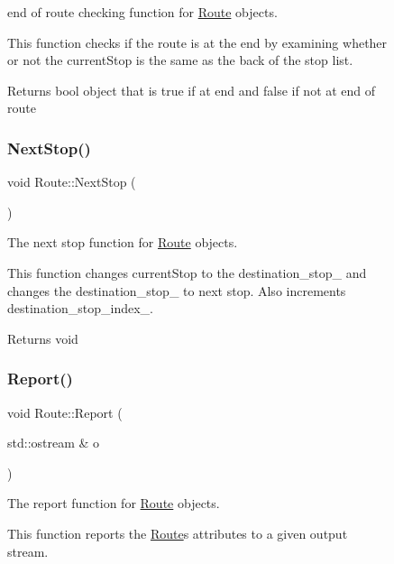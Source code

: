 \begin{figure}[H]
\begin{center}
end of route checking function for \hyperlink{classRoute}{Route} objects. 

This function checks if the route is at the end by examining whether or not the current\+Stop is the same as the back of the stop list.

\begin{DoxyReturn}{Returns}
bool object that is true if at end and false if not at end of route 
\end{DoxyReturn}
\mbox{\label{classRoute_aefdcf5a8db15f50d840585914744af6f}} 
\subsubsection{\texorpdfstring{Next\+Stop()}{NextStop()}}
{\footnotesize\ttfamily void Route\+::\+Next\+Stop (\begin{DoxyParamCaption}{ }\end{DoxyParamCaption})}



The next stop function for \hyperlink{classRoute}{Route} objects. 

This function changes current\+Stop to the destination\+\_\+stop\+\_\+ and changes the destination\+\_\+stop\+\_\+ to next stop. Also increments destination\+\_\+stop\+\_\+index\+\_\+.

\begin{DoxyReturn}{Returns}
void 
\end{DoxyReturn}
\mbox{\label{classRoute_a6115a741ea15af716c1a624627ec954a}} 
\subsubsection{\texorpdfstring{Report()}{Report()}}
{\footnotesize\ttfamily void Route\+::\+Report (\begin{DoxyParamCaption}\item[{std\+::ostream \&}]{o }\end{DoxyParamCaption})}



The report function for \hyperlink{classRoute}{Route} objects. 

This function reports the \hyperlink{classRoute}{Route}\textquotesingle{}s attributes to a given output stream.



\end{center}
\end{figure}
